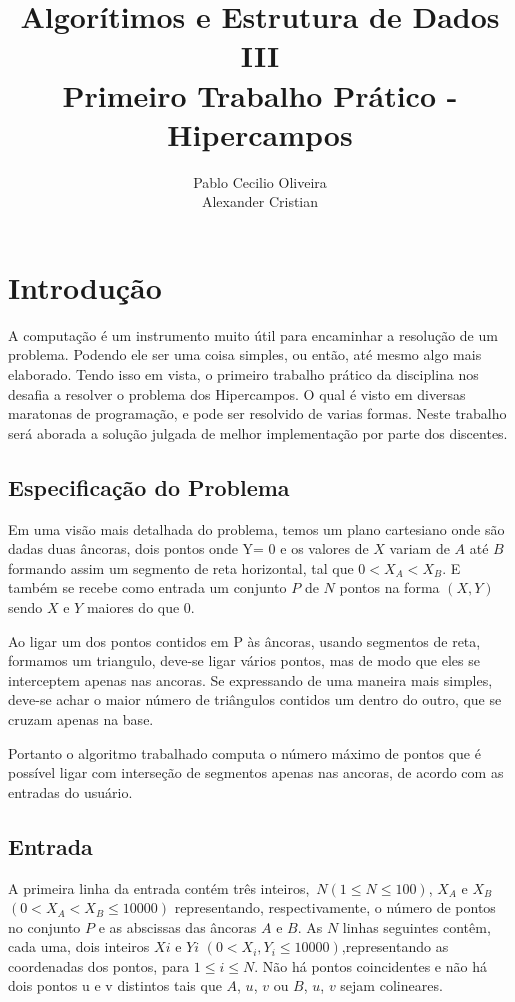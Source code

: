 \documentclass[12pt,a4paper]{article}
\author{Pablo Cecilio Oliveira\\
	Alexander Cristian}
\title{Algorítimos e Estrutura de Dados III\\
	Primeiro Trabalho Prático - Hipercampos}
\date{}
\begin{document}
\maketitle

\section{Introdução}

A computação é um instrumento muito útil para encaminhar a resolução de um problema. Podendo ele ser uma coisa simples, ou então, até mesmo algo mais elaborado. Tendo isso em vista, o primeiro trabalho prático da disciplina nos desafia a resolver o problema dos Hipercampos. O qual é visto em diversas  maratonas de programação, e pode ser resolvido de varias formas. Neste trabalho será aborada a solução julgada de melhor implementação por parte dos discentes.

\subsection{Especificação do Problema}

Em uma visão mais detalhada do problema, temos um plano cartesiano onde são dadas duas âncoras, dois pontos onde Y= 0 e os valores de $X$ variam de $A$ até $B$ formando assim um segmento de reta horizontal, tal que $0 < X_A < X_B$. E também se recebe como entrada um conjunto $P$ de $N$ pontos na forma $(X,Y)$ sendo $X$ e $Y$ maiores do que 0.

Ao ligar um dos pontos contidos em P às âncoras, usando segmentos de reta, formamos um triangulo, deve-se ligar vários pontos, mas de modo que eles se interceptem apenas nas ancoras. Se expressando de uma maneira mais simples, deve-se achar o maior número de triângulos contidos um dentro do outro, que se cruzam apenas na base.

Portanto o algoritmo trabalhado computa o número máximo de pontos que é possível ligar com interseção de segmentos apenas nas ancoras, de acordo com as entradas do usuário.

\subsection{Entrada}

A primeira linha da entrada contém três inteiros, $N(1 \leqslant N \leqslant 100)$, $X_A$ e $X_B$ $(0 < X_A < X_B \leqslant 10000)$ representando, respectivamente, o número de pontos no conjunto $P$ e as abscissas das âncoras $A$ e $B$. As $N$ linhas seguintes contêm, cada uma, dois inteiros $Xi$ e $Yi$ $(0 < X_i, Y_i \leqslant 10000)$,representando as coordenadas dos pontos, para $1 \leqslant i \leqslant N$. Não há pontos coincidentes e não há dois pontos u e v distintos tais que $A$, $u$, $v$ ou $B$, $u$, $v$ sejam colineares.
\end{document}

